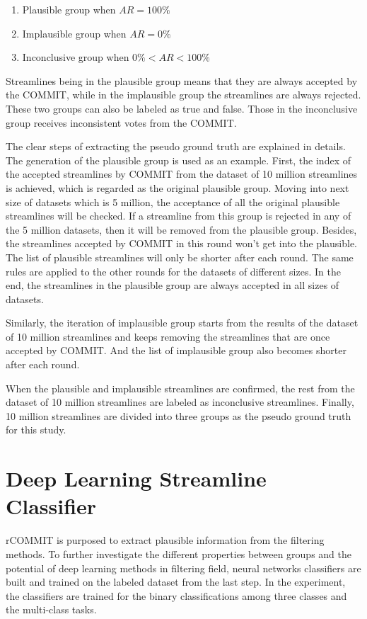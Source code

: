 \begin{enumerate}
    \item Plausible group when $AR = 100\%$
    \item Implausible group when $AR = 0\%$
    \item Inconclusive group when $0\% <AR< 100\%$
  \end{enumerate}

Streamlines being in the plausible group means that they are always accepted by the COMMIT, while in the implausible group the streamlines are always rejected.
These two groups can also be labeled as true and false. Those in the inconclusive group receives inconsistent votes from the COMMIT. 

The clear steps of extracting the pseudo ground truth are explained in details. The generation of the plausible group is used as an example. 
First, the index of the accepted streamlines by COMMIT from the dataset of 10 million streamlines is achieved, which is regarded as the original plausible group.
Moving into next size of datasets which is 5 million, the acceptance of all the original plausible streamlines will be checked. 
If a streamline from this group is rejected in any of the 5 million datasets, then it will be removed from the plausible group.
Besides, the streamlines accepted by COMMIT in this round won't get into the plausible. The list of plausible streamlines will only be shorter after each round.
The same rules are applied to the other rounds for the datasets of different sizes. In the end, the streamlines in the plausible group 
are always accepted in all sizes of datasets. 

Similarly, the iteration of implausible group starts from the results of the dataset of 10 million streamlines and keeps removing the 
streamlines that are once accepted by COMMIT. And the list of implausible group also becomes shorter after each round.

When the plausible and implausible streamlines are confirmed, the rest from the dataset of 10 million streamlines are labeled 
as inconclusive streamlines. Finally, 10 million streamlines are divided into three groups as the pseudo ground truth for this study.

\section{Deep Learning Streamline Classifier}
rCOMMIT is purposed to extract plausible information from the filtering methods. To further investigate the different properties between groups and the potential
of deep learning methods in filtering field, neural networks classifiers are built and trained on the labeled dataset from the last step.
In the experiment, the classifiers are trained for the binary classifications among three classes and the multi-class tasks.

